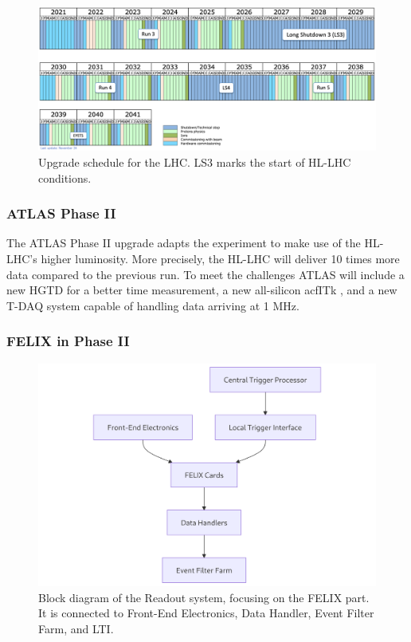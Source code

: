\begin{figure}[H]
\centering
\includegraphics[width=\textwidth]{images/introduction/LHC-schedule.png}
\caption{Upgrade schedule for the LHC. LS3 marks the start of HL-LHC conditions. \protect\cite{lhc_upgrade_schedule}}
\label{fig:LHC-schedule}
\end{figure}

\subsubsection{\acs{ATLAS} Phase II}

The \acs{ATLAS} Phase II upgrade \cite{Affolder:2799535} adapts the experiment to make use of the \acs{HL-LHC}'s higher luminosity. 
More precisely, the \acs{HL-LHC} will deliver 10 times more data compared to the previous run.  To meet the challenges \acs{ATLAS} will include a new \acf{HGTD} \cite{hgtd-phase2-upgrade} for a better time measurement, a new all-silicon acf{ITk} \cite{atlas-itk-pixel-detector}, and a new \acs{T-DAQ} system capable of handling data arriving at 1 MHz.

\subsubsection{\acs{FELIX} in Phase II}

\begin{figure}[H]
\centering
\includegraphics[width=\textwidth]{images/introduction/felix-block-diagram.png}
\caption{Block diagram of the Readout system, focusing on the FELIX part. It is connected to Front-End Electronics, Data Handler, Event Filter Farm, and \acf{LTI}.}
\label{fig:felix-block-diagram}
\end{figure}

